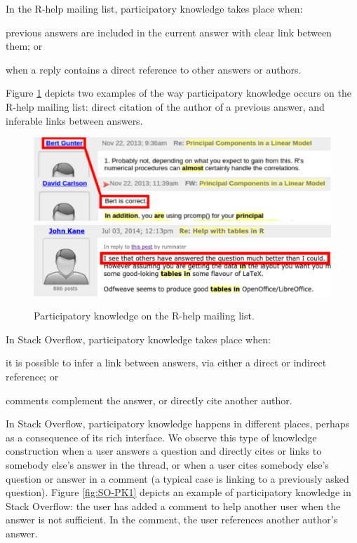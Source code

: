     In the R-help mailing list, participatory knowledge takes place when:
    \begin{enumerate*}[label=(\arabic*)]
    \item previous answers are included in the current answer with clear link between them; or
    \item when a reply contains a direct reference to other answers or authors.
    \end{enumerate*}
    Figure \ref{fig:ML-PK1} depicts two examples of the way participatory knowledge occurs on the R-help mailing list:
    direct citation of the author of a previous answer, and inferable links between answers.

    
    \begin{figure}[!htb]
        \centering
        \includegraphics[width=\columnwidth]{Figures/ML-PKimg2}
        \includegraphics[width=\columnwidth]{Figures/ML-PKimg11}
        \caption[Participatory knowledge on the R-help mailing list.]{Participatory knowledge on the R-help mailing list.}
        \label{fig:ML-PK1}
\vspace{-3mm}
    \end{figure}

    In Stack Overflow, participatory knowledge takes place when:
    \begin{enumerate*}[label=(\arabic*)]
    \item it is possible to infer a link between answers, via either a direct or indirect reference; or
    \item comments complement the answer, or directly cite another author.
    \end{enumerate*}

    In Stack Overflow, participatory knowledge happens in different places, perhaps as a consequence
    of its rich interface.  We observe this type of knowledge construction when a user answers a
    question and directly cites or links to somebody else's  answer in the thread, or when a
    user cites somebody else's question or answer in a comment (a typical case is linking to a previously asked question).
    Figure \ref{fig:SO-PK1} depicts an example of participatory knowledge in Stack Overflow: the
    user has added a comment to help another user when the answer is not sufficient.  In the comment, the user references another author's answer.

